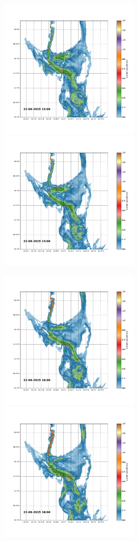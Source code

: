 \documentclass[12pt,a4paper,english]{article}
\begin{document}
\begin{figure}[h]
\centerline{
\includegraphics*[trim=2.0cm 3cm 6.0cm 3.5cm,clip=true,height=7cm]{Python/stromfelt_94}
\includegraphics*[trim=3.7cm 3cm 1.3cm 3.5cm,clip=true,height=7cm]{Python/stromfelt_96}
}
\centerline{
\includegraphics*[trim=2.0cm 3cm 6.0cm 3.5cm,clip=true,height=7cm]{Python/stromfelt_98}
\includegraphics*[trim=3.7cm 3cm 1.3cm 3.5cm,clip=true,height=7cm]{Python/stromfelt_100}
}
\end{figure}
\end{document}
